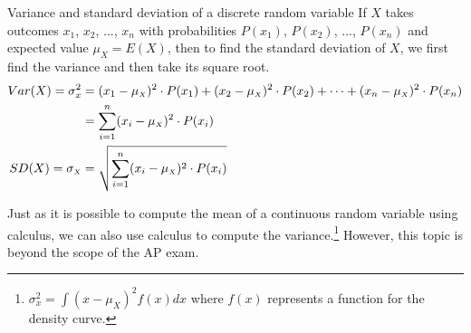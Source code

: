 \begin{onebox}{Variance and standard deviation of a discrete random variable}
If $X$ takes outcomes $x_1$, $x_2$, ..., $x_n$ with probabilities $P(x_1)$,  $P(x_2)$, ..., $P(x_n)$ and expected value $\mu_{\scriptscriptstyle{X}}=E(X)$, then to find the standard deviation of $X$, we first find the variance and then take its square root.
\begin{align*}
Var(X) = \sigma^2_x &= (x_1-\mu_{\scriptscriptstyle{X}})^2\cdot P(x_1) + (x_2-\mu_{\scriptscriptstyle{X}})^2\cdot P(x_2) + \cdots +  (x_n-\mu_{\scriptscriptstyle{X}})^2\cdot P(x_n) \notag \\
	&= \sum_{i=1}^{n} (x_i - \mu_{\scriptscriptstyle{X}})^2 \cdot P(x_i) \notag \\
SD(X) = \sigma_{\scriptscriptstyle{X}} &= \sqrt{ \sum_{i=1}^{n} (x_i - \mu_{\scriptscriptstyle{X}})^2 \cdot P(x_i)}
\end{align*}
\end{onebox}

Just as it is possible to compute the mean of a continuous random variable using calculus, we can also use calculus to compute the variance.\footnote{$\sigma^2_x = \int (x - \mu_{\scriptscriptstyle{X}})^2f(x)dx$ where $f(x)$ represents a function for the density curve.} However, this topic is beyond the scope of the AP exam.

